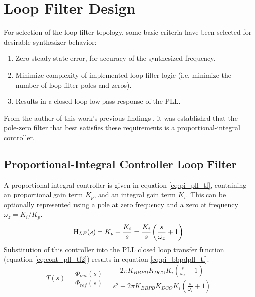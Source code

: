 \section{Loop Filter Design}\label{sec:design_lf}
	For selection of the loop filter topology, some basic criteria have been selected for desirable synthesizer behavior:
	\begin{enumerate}[itemsep=0pt,label=\protect\mycirc{\arabic*}]
		\setlength\itemsep{-0.8em}
		\item Zero steady state error, for accuracy of the synthesized frequency.
		\item Minimize complexity of implemented loop filter logic (i.e. minimize the number of loop filter poles and zeros).
		\item Results in a closed-loop low pass response of the PLL.
	\end{enumerate}
	From the author of this work's previous findings \cite{Me}, it was established that the pole-zero filter that best satisfies these requirements is a proportional-integral controller.

\subsection{Proportional-Integral Controller Loop Filter}
 A proportional-integral controller \cite{ogata_2010_pid} is given in equation \ref{eq:pi_pll_tf}, containing an proportional gain term $K_p$, and an integral gain term $K_i$. This can be optionally represented using a pole at zero frequency and a zero at frequency $\omega_z = K_i/K_p$.
			\begin{equation} \label{eq:pi_pll_tf}
				\textnormal{H}_{LF}(s) = K_p + \frac{K_i}{s}  = \frac{K_i}{s}\left(\frac{s}{\omega_z} + 1\right) 
			\end{equation}
			Substitution of this controller into the PLL closed loop transfer function (equation \ref{eq:cont_pll_tf2}) results in equation \ref{eq:pi_bbpdpll_tf}.
			\begin{equation}\label{eq:pi_bbpdpll_tf}
				T(s) = \frac{\Phi_{out}(s)}{\Phi_{ref}(s)} =  \frac{ 2\pi K_{BBPD}K_{DCO}K_{i} \left(\frac{s}{\omega_z} + 1\right) }{s^2 + 2\pi K_{BBPD}K_{DCO}K_{i}\left(\frac{s}{\omega_z} + 1\right) }
			\end{equation}

